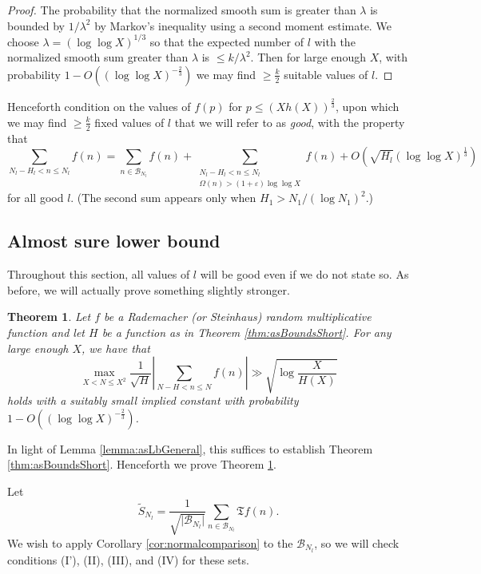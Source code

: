 \documentclass[11pt]{tran-l}
\newtheorem{theorem}{Theorem}[section]
\theoremstyle{definition}
\theoremstyle{remark}
\numberwithin{equation}{section}
\begin{document}
\begin{proof}
 The probability that the normalized smooth sum is greater than $\lambda$ is bounded by $1/\lambda^2$ by Markov's inequality using a second moment estimate. We choose  $\lambda = (\log\log X)^{1/3}$ so that the expected number of $l$ with the normalized smooth sum greater than $\lambda$ is $\leq k/\lambda^2$. Then for large enough $X$, with probability $1-O((\log \log X)^{-\frac{2}{3}})$ we may find $\geq \frac{k}{2}$ suitable values of $l$. 
\end{proof}

Henceforth condition on the values of $f(p)$ for $p\leq (Xh(X))^{\frac{2}{3}}$, upon which we may find $\geq \frac{k}{2}$ fixed values of $l$ that we will refer to as \emph{good}, with the property that
\begin{equation*}
    \sum_{N_l - H_l < n\leq N_l}f(n) = \sum_{n\in\mathcal B_{N_l}}f(n) + \sum_{\substack{N_l-H_l<n\leq N_l \\ \Omega(n)>(1+\varepsilon)\log\log X}} f(n) + O\left(\sqrt{H_l}(\log \log X)^{\frac{1}{3}} \right)
\end{equation*} for all good $l$. (The second sum appears only when $H_1 > N_1/(\log N_1)^2$.)



\subsection{Almost sure lower bound}
Throughout this section, all values of $l$ will be good even if we do not state so. As before, we will actually prove something slightly stronger.
\begin{theorem}\label{thm:localizedBoundShort}
    Let $f$ be a Rademacher (or Steinhaus) random multiplicative function and let $H$ be a function as in Theorem \ref{thm:asBoundsShort}. For any large enough $X$, we have that 
    \begin{equation*}
        \max_{X<N\leq X^2} \frac{1}{\sqrt H} \left\lvert\sum_{N-H<n\leq N}f(n) \right\rvert \gg \sqrt{\log \frac{X}{H(X)}}
    \end{equation*} holds with a suitably small implied constant with probability $1-O((\log \log X)^{-\frac{2}{3}})$. 
\end{theorem}

In light of Lemma \ref{lemma:asLbGeneral}, this suffices to establish Theorem \ref{thm:asBoundsShort}. Henceforth we prove Theorem \ref{thm:localizedBoundShort}. 

Let
\begin{equation*}
    \widetilde S_{N_l} = \frac{1}{\sqrt{\lvert \mathcal B_{N_l}\rvert}}\sum_{n\in\mathcal B_{N_l}} \mathfrak Tf(n).
\end{equation*}
We wish to apply Corollary \ref{cor:normalcomparison} to the $\mathcal B_{N_l}$, so we will check conditions (I'), (II), (III), and (IV) for these sets.
\end{document}
